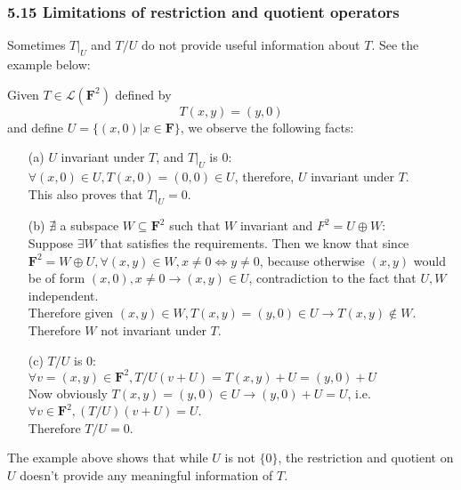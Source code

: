 \documentclass{article}
\begin{document}
\subsubsection*{5.15 Limitations of restriction and quotient operators}
Sometimes $T|_{U}$ and $T/U$ do not provide useful information about $T$. See the example below:
\begin{addmargin}[1em]{0em}
    Given $T \in \mathcal{L}(\mathbf{F}^2)$ defined by
    \begin{equation*}
        T(x, y) = (y, 0)
    \end{equation*}
    and define $U = \{(x, 0)| x \in \mathbf{F}\}$, we observe the following facts:
    \begin{itemize}
        \item[(a)] $U$ invariant under $T$, and $T|_{U}$ is $0$:\\
        $\forall (x, 0) \in U, T(x, 0) = (0, 0) \in U$, therefore, $U$ invariant under $T$.\\
        This also proves that $T|_{U} = 0$.
        \item[(b)] $\nexists$ a subspace $W \subseteq \mathbf{F}^2$ such that $W$ invariant and $F^2 = U \oplus W$:\\
        Suppose $\exists W$ that satisfies the requirements. Then we know that since $\mathbf{F}^2 = W \oplus U, \forall (x, y) \in W, x \neq 0 \iff y \neq 0$, because otherwise $(x, y)$ would be of form $(x, 0), x \neq 0 \rightarrow (x, y) \in U$, contradiction to the fact that $U, W$ independent.\\
        Therefore given $(x, y) \in W, T(x, y) = (y, 0) \in U \rightarrow T(x, y) \notin W$. Therefore $W$ not invariant under $T$.
        \item[(c)] $T/U$ is $0$:\\
        $\forall v = (x, y) \in \mathbf{F}^2, T/U(v + U)= T(x, y) + U = (y, 0) + U$\\
        Now obviously $T(x, y) = (y, 0) \in U \rightarrow (y, 0) + U = U$, i.e. $\forall v \in \mathbf{F}^2, (T/U)(v+U) = U$.\\
        Therefore $T/U = 0$.
    \end{itemize}
\end{addmargin}
The example above shows that while $U$ is not $\{0\}$, the restriction and quotient on $U$ doesn't provide any meaningful information of $T$.
\end{document}
